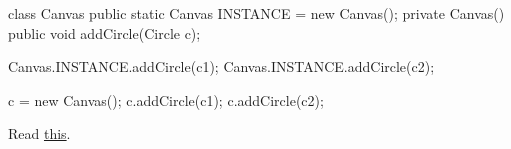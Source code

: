 \documentclass{article}
\begin{document}
\begin{pptWide}{2}
{\small\begin{ffcode}
class Canvas {
  public static Canvas INSTANCE =
    new Canvas();
  private Canvas() {}
  public void addCircle(Circle c);
}

Canvas.INSTANCE.addCircle(c1);
Canvas.INSTANCE.addCircle(c2);
\end{ffcode}
}
\par\columnbreak\par
{\small\begin{ffcode}
c = new Canvas();
c.addCircle(c1);
c.addCircle(c2);
\end{ffcode}
}
\end{pptWide}\par
Read \href{https://www.yegor256.com/2016/06/27/singletons-must-die.html}{this}.
\plush{}
\end{document}
